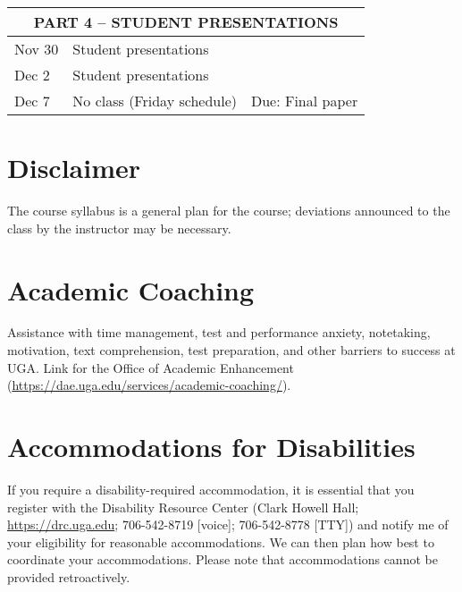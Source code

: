 \documentclass[12pt]{article}
\begin{document}
\begin{center}
\begin{tabular}[c]{lll}
\hline
           \multicolumn{3}{c}{PART 4 -- STUDENT PRESENTATIONS}                                                   \\
\hline
Nov 30     & Student presentations                        &                                                      \\
Dec 2      & Student presentations                        &                                                      \\
\hline
Dec 7      & No class (Friday schedule)                   & Due: Final paper                                     \\
\hline \hline
\end{tabular}
\end{center}




\vspace{-2mm}
\section*{\normalsize Disclaimer}
\vspace{-4mm}

The course syllabus is a general plan for the course; deviations
announced to the class by the instructor may be necessary. 


\vspace{-2mm}
\section*{\normalsize Academic Coaching}
\vspace{-4mm}

Assistance with time management, test and performance anxiety,
notetaking, motivation, text comprehension, test preparation, and
other barriers to success at UGA. Link for the Office of Academic
Enhancement (\url{https://dae.uga.edu/services/academic-coaching/}). 

\vspace{-2mm}
\section*{\normalsize Accommodations for Disabilities}
\vspace{-4mm}

If you require a disability-required accommodation, it is essential
that you register with the Disability Resource Center (Clark Howell
Hall; \url{https://drc.uga.edu}; 706-542-8719 [voice]; 706-542-8778 [TTY])
and notify me of your eligibility for reasonable accommodations. We
can then plan how best to coordinate your accommodations. Please note
that accommodations cannot be provided retroactively.
\end{document}
